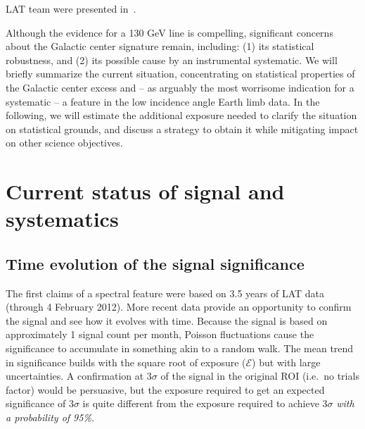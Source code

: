 \documentclass[aps,prd,superscriptaddress,nofootinbib,fixlfloat, 12pt]{revtex4-1}
\begin{document}
LAT team were presented in~\cite{bloom_charles_fermi_lat_line, Albert:Talk}.
 
Although the evidence for a 130 GeV line is compelling, significant concerns
about the Galactic center signature remain, including: (1) its statistical
robustness, and (2) its possible cause by an instrumental systematic. We will
briefly summarize the current situation, concentrating on statistical
properties of the Galactic center excess and -- as arguably the most worrisome
indication for a systematic -- a feature in the low incidence angle Earth
limb data. 
%
In the following, we will estimate the additional exposure needed to clarify
the situation on statistical grounds, and discuss a strategy to obtain it
while mitigating impact on other science objectives. 

\section{Current status of signal and systematics}
\subsection{Time evolution of the signal significance}
The first claims of a spectral feature \citep{Bringmann:2012,Weniger:2012}
were based on 3.5 years of LAT data (through 4 February 2012).  More recent data provide an opportunity to confirm the signal and see how it evolves with
time. Because the signal is based on approximately 1 signal count per month,
Poisson fluctuations cause the significance to accumulate in
something akin to a random walk.  The mean trend in significance builds with
the square root of exposure ($\mathcal{E}$) but with large uncertainties.  A confirmation at $3\sigma$ of the
signal in the original ROI (i.e.~no trials factor) would be persuasive, but
the exposure required to get an expected significance of $3\sigma$ is quite
different from the exposure required to achieve $3\sigma$ \emph{with a
probability of 95\%.}
\end{document}
